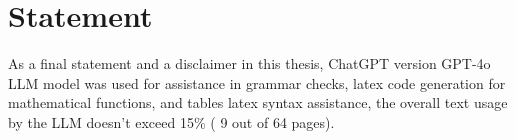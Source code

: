 \chapter*{Statement}

As a final statement and a disclaimer in this thesis, ChatGPT version GPT-4o LLM model was used  \cite{chatgpt}  for assistance in grammar checks, latex code generation for mathematical functions, and tables latex syntax assistance, the overall text usage by the LLM doesn't exceed 15\% ( 9 out of 64 pages).

